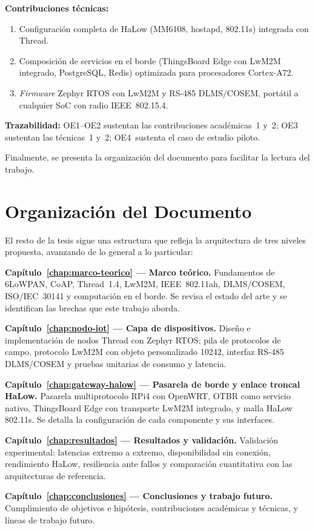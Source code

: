 \textbf{Contribuciones técnicas:}
\begin{enumerate}
    \item Configuración completa de HaLow (MM6108, hostapd, 802.11s) integrada con Thread.
    \item Composición de servicios en el borde (ThingsBoard Edge con LwM2M integrado, PostgreSQL, Redis) optimizada para procesadores Cortex-A72.
    \item \emph{Firmware} Zephyr RTOS con LwM2M y RS-485 DLMS/COSEM, portátil a cualquier SoC con radio IEEE~802.15.4.
\end{enumerate}

\textbf{Trazabilidad:} OE1--OE2 sustentan las contribuciones académicas~1 y~2; OE3 sustentan las técnicas~1 y~2; OE4~sustenta el caso de estudio piloto.

Finalmente, se presenta la organización del documento para facilitar la lectura del trabajo.


\section{Organización del Documento}

El resto de la tesis sigue una estructura que refleja la arquitectura de tres niveles propuesta, avanzando de lo general a lo particular:

\textbf{Capítulo~\ref{chap:marco-teorico} --- Marco teórico.} Fundamentos de 6LoWPAN, CoAP, Thread~1.4, LwM2M, IEEE~802.11ah, DLMS/COSEM, ISO/IEC~30141 y computación en el borde. Se revisa el estado del arte y se identifican las brechas que este trabajo aborda.

\textbf{Capítulo~\ref{chap:nodo-iot} --- Capa de dispositivos.} Diseño e implementación de nodos Thread con Zephyr RTOS: pila de protocolos de campo, protocolo LwM2M con objeto personalizado 10242, interfaz RS-485 DLMS/COSEM y pruebas unitarias de consumo y latencia.

\textbf{Capítulo~\ref{chap:gateway-halow} --- Pasarela de borde y enlace troncal HaLow.} Pasarela multiprotocolo RPi4 con OpenWRT, OTBR como servicio nativo, ThingsBoard Edge con transporte LwM2M integrado, y malla HaLow 802.11s. Se detalla la configuración de cada componente y sus interfaces.

\textbf{Capítulo~\ref{chap:resultados} --- Resultados y validación.} Validación experimental: latencias extremo a extremo, disponibilidad sin conexión, rendimiento HaLow, resiliencia ante fallos y comparación cuantitativa con las arquitecturas de referencia.

\textbf{Capítulo~\ref{chap:conclusiones} --- Conclusiones y trabajo futuro.} Cumplimiento de objetivos e hipótesis, contribuciones académicas y técnicas, y líneas de trabajo futuro.
